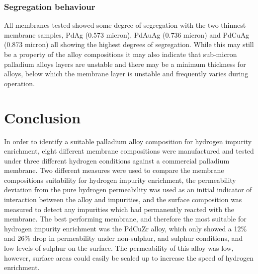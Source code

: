 \subsubsection{Segregation behaviour}
All membranes tested showed some degree of segregation with the two thinnest membrane samples, PdAg (0.573 micron), PdAuAg (0.736  micron) and PdCuAg (0.873 micron) all showing the highest degrees of segregation. While this may still be a property of the alloy compositions it may also indicate that sub-micron palladium alloys layers are unstable and there may be a minimum thickness for alloys, below which the membrane layer is unstable and frequently varies during operation.

\section{Conclusion}
In order to identify a suitable palladium alloy composition for hydrogen impurity enrichment, eight different membrane compositions were manufactured and tested under three different hydrogen conditions against a commercial palladium membrane. Two different measures were used to compare the membrane compositions suitability for hydrogen impurity enrichment, the permeability deviation from the pure hydrogen permeability was used as an initial indicator of interaction between the alloy and impurities, and the surface composition was measured to detect any impurities which had permanently reacted with the membrane. 
The best performing membrane, and therefore the most suitable for hydrogen impurity enrichment was the PdCuZr alloy, which only showed a 12\% and 26\% drop in permeability under non-sulphur, and sulphur conditions, and low levels of sulphur on the surface.  The permeability of this alloy was low, however, surface areas could easily be scaled up to increase the speed of hydrogen enrichment. 



